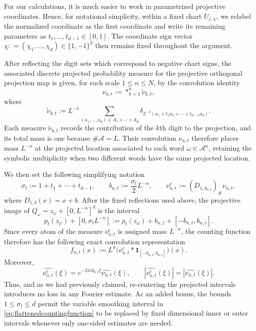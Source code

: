 \documentclass[12pt]{amsart}
\numberwithin{equation}{section}
\begin{document}
For our calculations, it is much easier to work in parametrized projective coordinates. Hence, for notational simplicity, within a fixed chart $U_{j, \chi}$, we relabel the normalized coordinate as
the first coordinate and write its remaining parameters as $t_1,\ldots,t_{d-1}\in[0,1]$. The coordinate sign vector $\chi : = (\chi_1,...,\chi_d) \in \{1,-1\}^d$ then remains fixed throughout the argument. 

After reflecting the digit sets which correspond to negative chart signs, the associated discrete projected probability measure for the projective orthogonal projection map is given, for each scale $1 \leq n \leq N$, by the convolution identity
\begin{equation}\label{eq:bignu}
 \nu_{n,t}:=\mathop{\ast}_{k=1}^n\widetilde\nu_{k,t},
\end{equation}
where
\begin{equation}\label{eq:littlenu}
 \widetilde\nu_{k,t}
 :=L^{-1}\!\sum_{(a_1,\ldots,a_d)\in A_1\times\cdots\times A_d}
 \delta_{L^{-k}(a_1+t_1a_2+\cdots+t_{d-1}a_d)}.
\end{equation}
Each measure $\widetilde\nu_{k,t}$ records the contribution of the $k$th digit to the projection, and its total mass is one because $\#\mathcal A=L$. Their convolution $\nu_{n,t}$ therefore places mass $L^{-n}$ at the projected location associated to each word $\omega\in\mathcal A^n$, retaining the symbolic multiplicity when two different words have the same projected location.

We then set the following simplifying notation
\[
 \sigma_t:=1+t_1+\cdots+t_{d-1},
 \qquad
 b_{n,t}:=\frac{\sigma_t}{2}L^{-n},
 \qquad
 \nu_{n,t}^{\mathrm c}:=(D_{1,b_{n,t}})_\#\nu_{n,t},
\]
where $D_{1,b}(x)=x+b$.  After the fixed reflections used above, the
projective image of $Q_\omega=z_\omega+[0,L^{-n}]^d$ is the interval
\[
 p_t(z_\omega)+[0,\sigma_tL^{-n}]
 :=p_t(z_\omega)+b_{n,t}
  +[-b_{n,t},b_{n,t}].
\]
Since every atom of the measure $\nu_{n,t}^{\mathrm c}$ is assigned mass $L^{-n}$, the counting function therefore has the following exact convolution representation
\begin{equation}\label{eq:flattenedcountingfunction}
 f_{n,t}(x)
 :=L^n\bigl(\nu_{n,t}^{\mathrm c}
 *\mathbf 1_{[-b_{n,t},b_{n,t}]}\bigr)(x).
\end{equation}
Moreover,
\begin{equation}\label{eq:centeredmeasurephase}
 \widehat{\nu_{n,t}^{\mathrm c}}(\xi)
 =e^{-2\pi ib_{n,t}\xi}\widehat{\nu_{n,t}}(\xi),
 \qquad
 |\widehat{\nu_{n,t}^{\mathrm c}}(\xi)|
 =|\widehat{\nu_{n,t}}(\xi)|.
\end{equation}
Thus, and as we had previously claimed, re-centering the projected intervals introduces no loss in any Fourier
estimate.  As an added bonus, the bounds $1\leq\sigma_t\leq d$ permit the variable smoothing
interval in \eqref{eq:flattenedcountingfunction} to be replaced by fixed
dimensional inner or outer intervals whenever only one-sided estimates are
needed.
\end{document}

